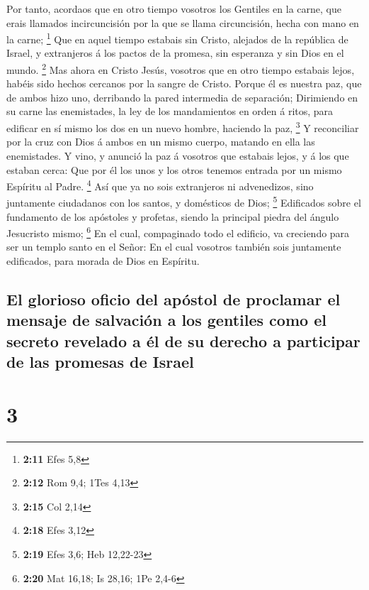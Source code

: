  Por tanto, acordaos que en otro tiempo vosotros los
Gentiles en la carne, que erais llamados incircuncisión por la que se
llama circuncisión, hecha con mano en la carne; \footnote{\textbf{2:11}
  Efes 5,8}  Que en aquel tiempo estabais sin Cristo,
alejados de la república de Israel, y extranjeros á los pactos de la
promesa, sin esperanza y sin Dios en el mundo. \footnote{\textbf{2:12}
  Rom 9,4; 1Tes 4,13}  Mas ahora en Cristo Jesús, vosotros
que en otro tiempo estabais lejos, habéis sido hechos cercanos por la
sangre de Cristo.  Porque él es nuestra paz, que de ambos
hizo uno, derribando la pared intermedia de separación; 
Dirimiendo en su carne las enemistades, la ley de los mandamientos en
orden á ritos, para edificar en sí mismo los dos en un nuevo hombre,
haciendo la paz, \footnote{\textbf{2:15} Col 2,14}  Y
reconciliar por la cruz con Dios á ambos en un mismo cuerpo, matando en
ella las enemistades.  Y vino, y anunció la paz á vosotros
que estabais lejos, y á los que estaban cerca:  Que por él
los unos y los otros tenemos entrada por un mismo Espíritu al Padre.
\footnote{\textbf{2:18} Efes 3,12}  Así que ya no sois
extranjeros ni advenedizos, sino juntamente ciudadanos con los santos, y
domésticos de Dios; \footnote{\textbf{2:19} Efes 3,6; Heb 12,22-23}
 Edificados sobre el fundamento de los apóstoles y
profetas, siendo la principal piedra del ángulo Jesucristo mismo;
\footnote{\textbf{2:20} Mat 16,18; Is 28,16; 1Pe 2,4-6}  En
el cual, compaginado todo el edificio, va creciendo para ser un templo
santo en el Señor:  En el cual vosotros también sois
juntamente edificados, para morada de Dios en Espíritu.

\hypertarget{el-glorioso-oficio-del-apuxf3stol-de-proclamar-el-mensaje-de-salvaciuxf3n-a-los-gentiles-como-el-secreto-revelado-a-uxe9l-de-su-derecho-a-participar-de-las-promesas-de-israel}{%
\subsection{El glorioso oficio del apóstol de proclamar el mensaje de
salvación a los gentiles como el secreto revelado a él de su derecho a
participar de las promesas de
Israel}\label{el-glorioso-oficio-del-apuxf3stol-de-proclamar-el-mensaje-de-salvaciuxf3n-a-los-gentiles-como-el-secreto-revelado-a-uxe9l-de-su-derecho-a-participar-de-las-promesas-de-israel}}

\hypertarget{section-2}{%
\section{3}\label{section-2}}

